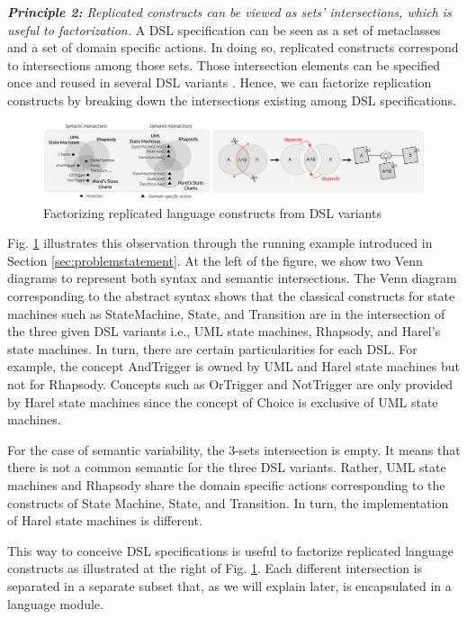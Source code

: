 \vspace{2mm}
\emph{\textbf{Principle 2:} Replicated constructs can be viewed as sets' intersections, which is useful to factorization.} A DSL specification can be seen as a set of metaclasses and a set of domain specific actions. In doing so, replicated constructs correspond to intersections among those sets. Those intersection elements can be specified once and reused in several DSL variants \cite[p. 60-61]{Voelter:2013b}. Hence, we can factorize replication constructs by breaking down the intersections existing among DSL specifications.

\begin{figure}[h!]
	\centering
	\includegraphics[width=1\linewidth]{images/principle2.png}
	\caption{Factorizing replicated language constructs from DSL variants}
	\label{fig:shape}
\end{figure}

Fig. \ref{fig:shape} illustrates this observation through the running example introduced in Section \ref{sec:problemstatement}. At the left of the figure, we show two Venn diagrams to represent both syntax and semantic intersections. The Venn diagram corresponding to the abstract syntax shows that the classical constructs for state machines such as StateMachine, State, and Transition are in the intersection of the three given DSL variants i.e., UML state machines, Rhapsody, and Harel's state machines. In turn, there are certain particularities for each DSL. For example, the concept AndTrigger is owned by UML and Harel state machines but not for Rhapsody. Concepts such as OrTrigger and NotTrigger are only provided by Harel state machines since the concept of Choice is exclusive of UML state machines.

For the case of semantic variability, the 3-sets intersection is empty. It means that there is not a common semantic for the three DSL variants. Rather, UML state machines and Rhapsody share the domain specific actions corresponding to the constructs of State Machine, State, and Transition. In turn, the implementation of Harel state machines is different. 

This way to conceive DSL specifications is useful to factorize replicated language constructs as illustrated at the right of Fig. \ref{fig:shape}. Each different intersection is separated in a separate subset that, as we will explain later, is encapsulated in a language module. 



